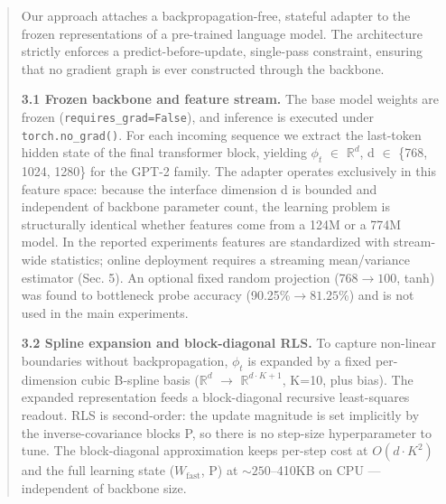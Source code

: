 \documentclass[11pt]{article}
\begin{document}
\begin{quote}
Our approach attaches a backpropagation-free, stateful adapter to the frozen representations of a pre-trained language model. The architecture strictly enforces a predict-before-update, single-pass constraint, ensuring that no gradient graph is ever constructed through the backbone.

\textbf{3.1 Frozen backbone and feature stream.} The base model weights are frozen (\texttt{requires\_grad=False}), and inference is executed under \texttt{torch.no\_grad()}. For each incoming sequence we extract the last-token hidden state of the final transformer block, yielding \(\phi_t\) \(\in\) \(\mathbb{R}^d\), d \(\in\) \{768, 1024, 1280\} for the GPT-2 family. The adapter operates exclusively in this feature space: because the interface dimension d is bounded and independent of backbone parameter count, the learning problem is structurally identical whether features come from a 124M or a 774M model. In the reported experiments features are standardized with stream-wide statistics; online deployment requires a streaming mean/variance estimator (Sec. 5). An optional fixed random projection (768\(\to 100\), tanh) was found to bottleneck probe accuracy (90.25\%\(\to 81.25\)\%) and is not used in the main experiments.

\textbf{3.2 Spline expansion and block-diagonal RLS.} To capture non-linear boundaries without backpropagation, \(\phi_t\) is expanded by a fixed per-dimension cubic B-spline basis (\(\mathbb{R}^d\) \(\to\) \(\mathbb{R}^{d\cdot K+1}\), K=10, plus bias). The expanded representation feeds a block-diagonal recursive least-squares readout. RLS is second-order: the update magnitude is set implicitly by the inverse-covariance blocks P, so there is no step-size hyperparameter to tune. The block-diagonal approximation keeps per-step cost at \(O(d\cdot K^2)\) and the full learning state (\(W_{\mathrm{fast}}\), P) at \(\sim 250\)--410KB on CPU --- independent of backbone size.


\end{quote}
\end{document}
